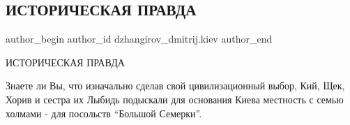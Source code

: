  
 
 
 
 
 
\subsection{ИСТОРИЧЕСКАЯ ПРАВДА}
\label{sec:28_10_2021.fb.dzhangirov_dmitrij.kiev.1.istoricheskaja_pravda}
 
\ifcmt
 author_begin
   author_id dzhangirov_dmitrij.kiev
 author_end
\fi

ИСТОРИЧЕСКАЯ ПРАВДА

Знаете ли Вы, что изначально сделав свой цивилизационный выбор, Кий, Щек, Хорив
и сестра их Лыбидь подыскали для основания Киева местность с семью холмами -
для посольств \enquote{Большой Семерки}.

